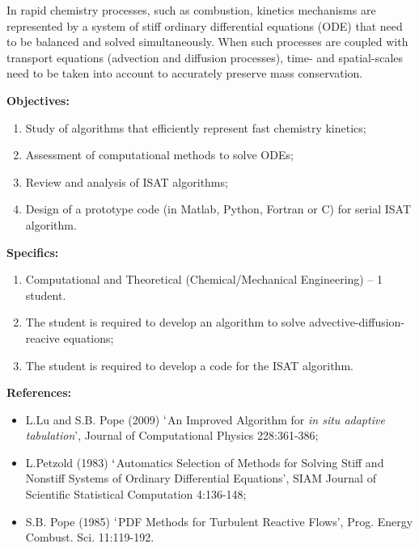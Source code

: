 \documentclass[12pts,a4paper,amsmath,amssymb,floatfix]{article}%
\begin{document}
\begin{enumerate}[label=\bfseries Project \arabic*:]
In rapid chemistry processes, such as combustion, kinetics mechanisms are represented by a system of stiff ordinary differential equations (ODE) that need to be balanced and solved simultaneously. When such processes are coupled with transport equations (advection and diffusion processes), time- and spatial-scales need to be taken into account to accurately preserve mass conservation. 

\noindent
{\bf Objectives:}
\begin{enumerate}
\item Study of algorithms that efficiently represent fast chemistry kinetics;
\item Assessment of computational methods to solve ODEs;
\item Review and analysis of ISAT algorithms;
\item Design of a prototype code (in Matlab, Python, Fortran or C) for serial ISAT algorithm.
\end{enumerate} 
 
\noindent
{\bf Specifics:} 
\begin{enumerate}
\item Computational and Theoretical (Chemical/Mechanical Engineering) -- 1 student.
\item The student is required to develop an algorithm to solve advective-diffusion-reacive equations;
\item The student is required to develop a code for the ISAT algorithm.
\end{enumerate}

\noindent
{\bf References:}
\begin{itemize}
\item L.Lu and S.B. Pope (2009) $\lq$An Improved Algorithm for {\it in situ adaptive tabulation}’, Journal of Computational Physics 228:361-386;
\item L.Petzold (1983) $\lq$Automatics Selection of Methods for Solving Stiff and Nonstiff Systems of Ordinary Differential Equations', SIAM Journal of Scientific Statistical Computation 4:136-148;
\item S.B. Pope (1985)  $\lq$PDF Methods for Turbulent Reactive Flows',  Prog. Energy Combust. Sci. 11:119-192.
\end{itemize}

\end{enumerate} 
\end{document}
